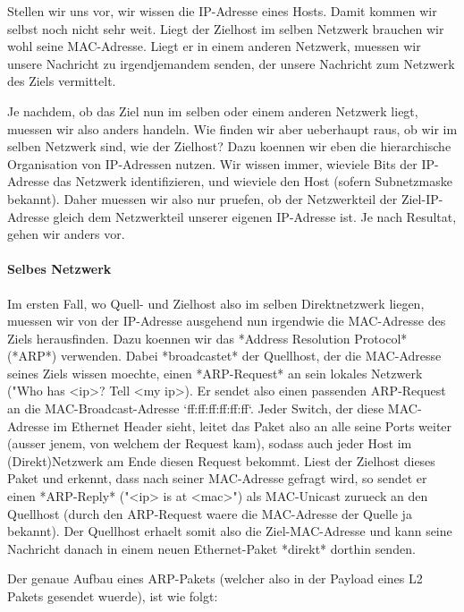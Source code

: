 Stellen wir uns vor, wir wissen die IP-Adresse eines Hosts. Damit kommen wir
selbst noch nicht sehr weit. Liegt der Zielhost im selben Netzwerk brauchen wir
wohl seine MAC-Adresse. Liegt er in einem anderen Netzwerk, muessen wir unsere
Nachricht zu irgendjemandem senden, der unsere Nachricht zum Netzwerk des Ziels
vermittelt.

Je nachdem, ob das Ziel nun im selben oder einem anderen Netzwerk liegt, muessen
wir also anders handeln. Wie finden wir aber ueberhaupt raus, ob wir im selben
Netzwerk sind, wie der Zielhost? Dazu koennen wir eben die hierarchische
Organisation von IP-Adressen nutzen. Wir wissen immer, wieviele Bits der
IP-Adresse das Netzwerk identifizieren, und wieviele den Host (sofern
Subnetzmaske bekannt). Daher muessen wir also nur pruefen, ob der Netzwerkteil
der Ziel-IP-Adresse gleich dem Netzwerkteil unserer eigenen IP-Adresse ist. Je
nach Resultat, gehen wir anders vor.

\paragraph{Selbes Netzwerk} 

Im ersten Fall, wo Quell- und Zielhost also im selben Direktnetzwerk liegen,
muessen wir von der IP-Adresse ausgehend nun irgendwie die MAC-Adresse des Ziels
herausfinden. Dazu koennen wir das *Address Resolution Protocol* (*ARP*)
verwenden. Dabei *broadcastet* der Quellhost, der die MAC-Adresse seines Ziels
wissen moechte, einen *ARP-Request* an sein lokales Netzwerk ("Who has <ip>?
Tell <my ip>). Er sendet also einen passenden ARP-Request an die
MAC-Broadcast-Adresse `ff:ff:ff:ff:ff:ff`. Jeder Switch, der diese MAC-Adresse
im Ethernet Header sieht, leitet das Paket also an alle seine Ports weiter
(ausser jenem, von welchem der Request kam), sodass auch jeder Host im
(Direkt)Netzwerk am Ende diesen Request bekommt. Liest der Zielhost dieses Paket
und erkennt, dass nach seiner MAC-Adresse gefragt wird, so sendet er einen
*ARP-Reply* ("<ip> is at <mac>") als MAC-Unicast zurueck an den Quellhost (durch
den ARP-Request waere die MAC-Adresse der Quelle ja bekannt). Der Quellhost
erhaelt somit also die Ziel-MAC-Adresse und kann seine Nachricht danach in einem
neuen Ethernet-Paket *direkt* dorthin senden.

Der genaue Aufbau eines ARP-Pakets (welcher also in der Payload eines L2 Pakets
gesendet wuerde), ist wie folgt:

